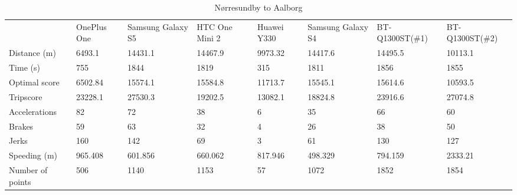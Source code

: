 \begin{table*}[tb]
\centering
\caption{Nørresundby to Aalborg}
\label{my-label}
\begin{tabular}{llllllll}
                 & OnePlus One & Samsung Galaxy S5 & HTC One Mini 2 & Huawei Y330 & Samsung Galaxy S4 & BT-Q1300ST(\#1) & BT-Q1300ST(\#2) \\
Distance (m)     & 6493.1      & 14431.1           & 14467.9        & 9973.32     & 14417.6           & 14495.5         & 10113.1         \\
Time (s)         & 755         & 1844              & 1819           & 315         & 1811              & 1856            & 1855            \\
Optimal score    & 6502.84     & 15574.1           & 15584.8        & 11713.7     & 15545.1           & 15614.6         & 10593.5         \\
Tripscore        & 23228.1     & 27530.3           & 19202.5        & 13082.1     & 18824.8           & 23916.6         & 27074.8         \\
Accelerations    & 82          & 72                & 38             & 6           & 35                & 66              & 60              \\
Brakes           & 59          & 63                & 32             & 4           & 26                & 38              & 50              \\
Jerks            & 160         & 142               & 69             & 3           & 61                & 130             & 127             \\
Speeding (m)     & 965.408     & 601.856           & 660.062        & 817.946     & 498.329           & 794.159         & 2333.21         \\
Number of points & 506         & 1140              & 1153           & 57          & 1072              & 1852            & 1854           
\end{tabular}
\end{table*}

